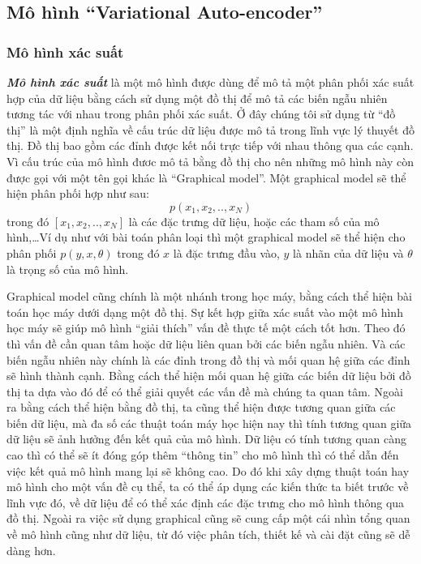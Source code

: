        

        
    


    \subsection{Mô hình ``Variational Auto-encoder''} 
        \subsubsection{Mô hình xác suất}
        \textbf{\textit{Mô hình xác suất}} là một mô hình được dùng để mô tả một phân 
        phối xác suất hợp của dữ liệu bằng cách sử dụng một đồ thị để mô tả các biến 
        ngẫu nhiên tương tác với nhau trong phân phối xác suất. Ở đây 
        chúng tôi sử dụng từ ``đồ thị'' là một định nghĩa về cấu trúc 
        dữ liệu được mô tả trong lĩnh vực lý thuyết đồ thị. Đồ thị 
        bao gồm các đỉnh được kết nối trực tiếp với nhau thông qua 
        các cạnh. Vì cấu trúc của mô hình đươc mô tả bằng đồ thị cho 
        nên những mô hình này còn được gọi với một tên gọi khác là 
        ``Graphical model''. 
        Một graphical model sẽ thể hiện phân phối hợp như sau:
        $$p(x_1,x_2, .. ,x_N)$$
        trong đó $[x_1,x_2,..,x_N]$ là các đặc trưng dữ liệu, hoặc các tham số của mô hình,\dots Ví dụ như với bài toán phân loại thì một graphical model sẽ thể hiện cho phân phối $p(y,x, \theta)$ trong đó $x$ là đặc trưng đầu vào, $y$ là nhãn của dữ liệu và $\theta$ là trọng số của mô hình. 

        Graphical model cũng chính là một nhánh trong học máy, bằng cách thể hiện bài toán học máy dưới dạng một đồ thị. 
        Sự kết hợp giữa xác suất vào một mô hình học máy sẽ giúp mô hình ``giải thích'' vấn đề thực tế một cách tốt hơn. 
        Theo đó thì vấn đề cần quan tâm hoặc dữ liệu liên quan bởi các biến ngẫu nhiên. Và các biến ngẫu nhiên này chính là các đỉnh trong đồ thị và mối quan hệ giữa các đỉnh sẽ hình thành cạnh. Bằng cách thể hiện mối quan hệ giữa các biến dữ liệu bởi đồ thị ta dựa vào đó để có thể giải quyết các vấn đề mà chúng ta quan tâm. Ngoài ra bằng cách thể hiện bằng đồ thị, ta cũng thể hiện được tương quan giữa các biến dữ liệu, mà đa số các thuật toán máy học hiện nay thì tính tương quan giữa dữ liệu sẽ ảnh hưởng đến kết quả của mô hình. Dữ liệu có tính tương quan càng cao thì có thể sẽ ít đóng góp thêm ``thông tin'' cho mô hình thì có thể dẫn đến việc kết quả mô hình mang lại sẽ không cao. Do đó khi xây dựng thuật toán hay mô hình cho một vấn đề cụ thể, ta có thể áp dụng các kiến thức ta biết trước về lĩnh vực đó, về dữ liệu để có thể xác định các đặc trưng cho mô hình thông qua đồ thị. Ngoài ra việc sử dụng graphical cũng sẽ cung cấp một cái nhìn tổng quan về mô hình cũng như dữ liệu, từ đó việc phân tích, thiết kế và cài đặt cũng sẽ dễ dàng hơn.

